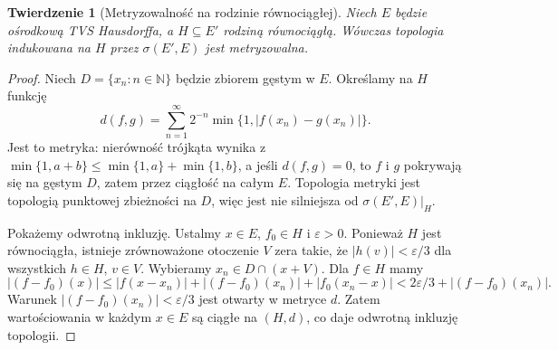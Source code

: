 \documentclass[11pt,a4paper]{article}
\numberwithin{equation}{section}
\theoremstyle{plain}
\newtheorem{twierdzenie}{Twierdzenie}[section]
\theoremstyle{definition}
\theoremstyle{remark}
\newcommand{\N}{\mathbb N}
\begin{document}
\begin{twierdzenie}[Metryzowalność na rodzinie równociągłej]
\label{thm:weakstar-metrizable-equicont}
Niech $E$ będzie ośrodkową TVS Hausdorffa, a $H\subseteq E'$
rodziną równociągłą. Wówczas topologia indukowana na $H$
przez $\sigma(E',E)$ jest metryzowalna.
\end{twierdzenie}
\begin{proof}
Niech $D=\{x_n:n\in\N\}$ będzie zbiorem gęstym w $E$.
Określamy na $H$ funkcję
\[
 d(f,g)=\sum_{n=1}^\infty 2^{-n}\min\{1,|f(x_n)-g(x_n)|\}.
\]
Jest to metryka: nierówność trójkąta wynika z
$\min\{1,a+b\}\le\min\{1,a\}+\min\{1,b\}$,
a jeśli $d(f,g)=0$, to $f$ i $g$ pokrywają się na gęstym
$D$, zatem przez ciągłość na całym $E$.
Topologia metryki jest topologią punktowej zbieżności na $D$,
więc jest nie silniejsza od $\sigma(E',E)|_H$.

Pokażemy odwrotną inkluzję. Ustalmy $x\in E$, $f_0\in H$
i $\varepsilon>0$. Ponieważ $H$ jest równociągła,
istnieje zrównoważone otoczenie $V$ zera takie, że
$|h(v)|<\varepsilon/3$ dla wszystkich $h\in H$, $v\in V$.
Wybieramy $x_n\in D\cap(x+V)$. Dla $f\in H$ mamy
\[
 |(f-f_0)(x)|\le |f(x-x_n)|+|(f-f_0)(x_n)|
                      +|f_0(x_n-x)|
 <2\varepsilon/3+|(f-f_0)(x_n)|.
\]
Warunek $|(f-f_0)(x_n)|<\varepsilon/3$ jest otwarty
w metryce $d$. Zatem wartościowania w każdym $x\in E$
są ciągłe na $(H,d)$, co daje odwrotną inkluzję topologii.
\end{proof}
\end{document}
